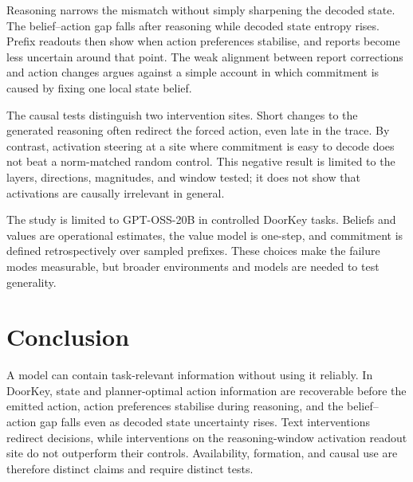\documentclass{article}
\begin{document}
Reasoning narrows the mismatch without simply sharpening the decoded state. The belief--action gap falls after reasoning while decoded state entropy rises. Prefix readouts then show when action preferences stabilise, and reports become less uncertain around that point. The weak alignment between report corrections and action changes argues against a simple account in which commitment is caused by fixing one local state belief.

The causal tests distinguish two intervention sites. Short changes to the generated reasoning often redirect the forced action, even late in the trace. By contrast, activation steering at a site where commitment is easy to decode does not beat a norm-matched random control. This negative result is limited to the layers, directions, magnitudes, and window tested; it does not show that activations are causally irrelevant in general.

The study is limited to GPT-OSS-20B in controlled DoorKey tasks. Beliefs and values are operational estimates, the value model is one-step, and commitment is defined retrospectively over sampled prefixes. These choices make the failure modes measurable, but broader environments and models are needed to test generality.

\section{Conclusion}\label{sec:conclusion}
A model can contain task-relevant information without using it reliably. In DoorKey, state and planner-optimal action information are recoverable before the emitted action, action preferences stabilise during reasoning, and the belief--action gap falls even as decoded state uncertainty rises. Text interventions redirect decisions, while interventions on the reasoning-window activation readout site do not outperform their controls. Availability, formation, and causal use are therefore distinct claims and require distinct tests.


\end{document}
